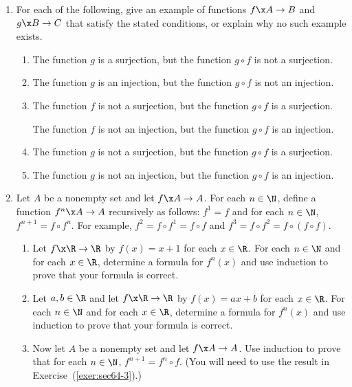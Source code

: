 \begin{enumerate}
\item For each of the following, give an example of functions  $f\x A \to B$ and \linebreak
$g\x B \to C$ that satisfy the stated conditions, or explain why no such example exists. 
\label{exer:sec64-8}

\begin{enumerate}
\yitem The function  $f$  is a surjection, but the function  $g \circ f$  is not a surjection.

\yitem The function  $f$  is an injection, but the function  $g \circ f$  is not an injection.

\item The function  $g$  is a surjection, but the function  $g \circ f$  is not a surjection.

\item The function  $g$  is an injection, but the function  $g \circ f$  is not an injection.

\item The function  $f$  is not a surjection, but the function  $g \circ f$  is a surjection.

\yitem The function  $f$  is not an injection, but the function  $g \circ f$  is an injection.


\item The function  $g$  is not a surjection, but the function $g \circ f$  is a surjection.

\item The function  $g$  is not an injection, but the function $g \circ f$  is an injection.
\end{enumerate}


\item Let $A$ be a nonempty set and let $f\x A \to A$.  For each $n \in \N$, define a function 
$f^n\x A \to A$ recursively as follows:  $f^1 = f$ and for each $n \in \N$, 
$f^{n+1} = f \circ f^n$.  For example, $f^2 = f \circ f^1 = f \circ f$ and 
$f^3 = f \circ f^2 = f \circ ( f \circ f )$.
\begin{enumerate}
\item Let $f\x  \R \to \R$ by $f(x) = x + 1$ for each $x \in \R$.  For each $n \in \N$ and for each $x \in \R$, determine a formula for $f^n(x)$ and use induction to prove that your formula is correct.

\item Let $a, b \in \R$ and let $f\x  \R \to \R$ by $f(x) = ax + b$ for each $x \in \R$.  For each $n \in \N$ and for each $x \in \R$, determine a formula for $f^n(x)$ and use induction to prove that your formula is correct.

\item Now let $A$ be a nonempty set and let $f\x A \to A$.  Use induction to prove that for each $n \in \N$, $f^{n+1} = f^n \circ f$.  (\note  You will need to use the result in Exercise~(\ref{exer:sec64-3}).)
\end{enumerate}
\end{enumerate}



